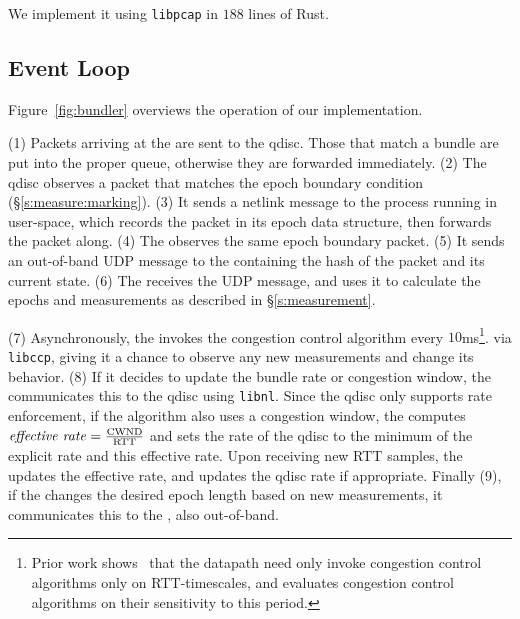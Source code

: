 \Para{\capoutbox} We implement it using \texttt{libpcap} in $188$ lines of Rust. 

\subsection{\name Event Loop}\label{s:impl:loop}
Figure~\ref{fig:bundler} overviews the operation of our \name implementation.

(1) Packets arriving at the \inbox are sent to the qdisc. Those that match a bundle are put into the proper queue, 
otherwise they are forwarded immediately. (2) The qdisc observes a packet that matches the epoch boundary
condition (\S\ref{s:measure:marking}). (3) It sends a netlink message to the \inbox process running in user-space, which records the packet
in its epoch data structure, then forwards the packet along. (4) The \outbox observes the same epoch boundary
packet. (5) It sends an out-of-band UDP message to the \inbox containing the hash of the packet and its current state. 
(6) The \inbox receives the UDP message, and uses it to calculate the epochs and measurements as described 
in \S\ref{s:measurement}.

(7) Asynchronously, the \inbox invokes the congestion control algorithm every $10$ms\footnote{Prior work shows~\cite{ccp} that the datapath need only invoke congestion control algorithms only on RTT-timescales, and evaluates congestion control algorithms on their sensitivity to this period.}.
via \texttt{libccp},
giving it a chance to observe any new measurements and change its behavior. (8) If it decides to update
the bundle rate or congestion window, the \inbox communicates this to the qdisc
using \texttt{libnl}. Since the qdisc only supports rate enforcement, if the algorithm
also uses a congestion window, the \inbox computes $\text{\emph{effective rate}} = \frac{\text{CWND}}{\text{RTT}}$
and sets the rate of the qdisc to the minimum of the explicit rate and this effective rate.
Upon receiving new RTT samples, the \inbox updates the effective rate, and updates the qdisc rate if appropriate.
Finally (9), if the \inbox changes the desired epoch length based on new measurements, it communicates this to the \outbox, also out-of-band.






